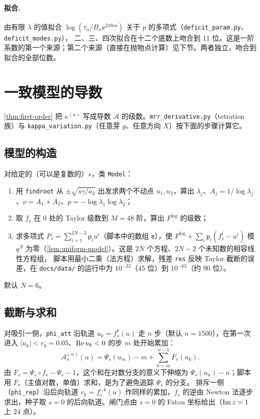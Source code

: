 \paragraph{拟合.} 由有限 $\lambda$ 的值拟合 $\log(\tau_n/B_n\ee^{2\pi\ii na})$ 关于 $p$ 的多项式（\texttt{deficit\_\allowbreak{}param.py}、\texttt{deficit\_\allowbreak{}modes.py}），
二、三、四次拟合在十二个底数上吻合到 11 位。这是一阶系数的第一个来源；第二个来源（直接在抛物点计算）见下节。两者独立，吻合到拟合的全部位数。

\section{一致模型的导数}\label{ch11:sec:derivative}

\cref{thm:first-order} 把 $\kappa^{(n)}$ 写成导数 $\dot{\mathcal A}$ 的级数。\texttt{mrr\_\allowbreak{}derivative.py}（tetration 族）与
\texttt{kappa\_\allowbreak{}variation.py}（任意芽 $g$、任意方向 $X$）按下面的步骤计算它。

\subsection{模型的构造}
对给定的（可以是复数的）$s$，类 \texttt{Model}：
\begin{enumerate}
\item 用 \texttt{findroot} 从 $\pm\sqrt{s\gamma/a_2}$ 出发求两个不动点 $u_1,u_2$，算出 $\lambda_j$、$A_j=1/\log\lambda_j$、$\nu=A_1+A_2$、$p=-\log\lambda_1\log\lambda_2$；
\item 取 $f_s$ 在 $0$ 处的 Taylor 级数到 $M=48$ 阶，算出 $F^{\log}$ 的级数；
\item 求多项式 $P_s=\sum_{i=1}^{2N-2}\mathsf p_iu^i$（脚本中的数组 \texttt{e}），使 $F^{\log}+\sum_i\mathsf p_i(f_s^i-u^i)$ 模 $q^N$ 为零（\cref{lem:uniform-model}）。这是 $2N$ 个方程、$2N-2$ 个未知数的相容线性方程组，
脚本用最小二乘（法方程）求解，残差 \texttt{res} 反映 Taylor 截断的误差，在 \texttt{docs/data/} 的运行中为 $10^{-32}$（45 位）到 $10^{-63}$（约 90 位）。
\end{enumerate}
默认 $N=6$。

\subsection{截断与求和}
对吸引一侧，\texttt{phi\_\allowbreak{}att} 沿轨道 $u_k=f_s^k(u)$ 走 $n$ 步（默认 $n=1500$），在第一次进入 $|u_k|<r_0=0.05$、$\operatorname{Re} u_k<0$ 的步 $m$ 处开始累加：
\[
 \mathcal A^{(n)}_s(u)=\Psi_s(u_m)-m+\sum_{k=m}^{n-1}F_s(u_k) .
\]
由 $F_s=\Psi_s\circ f_s-\Psi_s-1$，这个和在对数分支的意义下伸缩为 $\Psi_s(u_n)-n$；脚本用 $F_s$（主值对数，单值）求和，是为了避免追踪 $\Psi_s$ 的分支。
排斥一侧（\texttt{phi\_\allowbreak{}rep}）沿后向轨道 $v_k=f_s^{-k}(u)$ 作同样的累加，$f_s$ 的逆由 Newton 法逐步求出，种子取 $s=0$ 的后向轨道。闸门点由 $s=0$ 的 Fatou 坐标给出（$\operatorname{Im} z=1$ 上 $24$ 点）。

